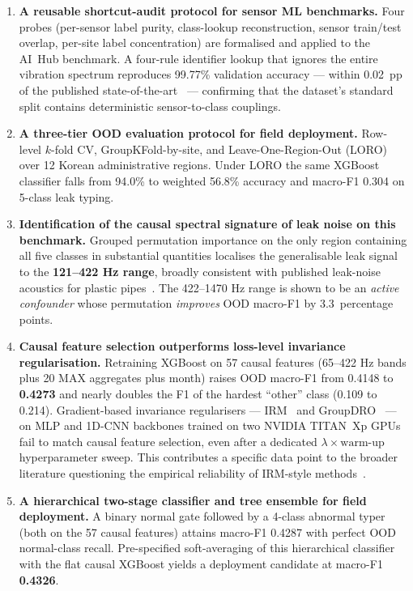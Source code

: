 \documentclass[sensors,article,submit,pdftex,oneauthor]{Definitions/mdpi}
\begin{document}
\begin{enumerate}
\item \textbf{A reusable shortcut-audit protocol for sensor ML
benchmarks.} Four probes (per-sensor label purity, class-lookup
reconstruction, sensor train/test overlap, per-site label
concentration) are formalised and applied to the AI~Hub
benchmark. A four-rule identifier lookup that ignores the entire
vibration spectrum reproduces 99.77\% validation accuracy ---
within 0.02~pp of the published state-of-the-art~\cite{lee2023leak}
--- confirming that the dataset's standard split contains
deterministic sensor-to-class couplings.

\item \textbf{A three-tier OOD evaluation protocol for field
deployment.} Row-level $k$-fold CV, GroupKFold-by-site, and
Leave-One-Region-Out (LORO) over 12 Korean administrative
regions. Under LORO the same XGBoost classifier falls from
94.0\% to weighted 56.8\% accuracy and macro-F1 0.304 on
5-class leak typing.

\item \textbf{Identification of the causal spectral signature of
leak noise on this benchmark.} Grouped permutation importance
on the only region containing all five classes in substantial
quantities localises the generalisable leak signal to the
\textbf{121--422 Hz range}, broadly consistent with published
leak-noise acoustics for plastic
pipes~\cite{hunaidi2000plastic,ismail2019review,shukla2020leakage}.
The 422--1470 Hz range is shown to be an \emph{active
confounder} whose permutation \emph{improves} OOD macro-F1 by
3.3~percentage points.

\item \textbf{Causal feature selection outperforms loss-level
invariance regularisation.} Retraining XGBoost on 57 causal
features (65--422 Hz bands plus 20 MAX aggregates plus month)
raises OOD macro-F1 from 0.4148 to \textbf{0.4273} and nearly
doubles the F1 of the hardest ``other'' class (0.109 to 0.214).
Gradient-based invariance regularisers --- IRM~\cite{arjovsky2019irm}
and GroupDRO~\cite{sagawa2020groupdro} --- on MLP and 1D-CNN
backbones trained on two NVIDIA TITAN~Xp GPUs fail to match
causal feature selection, even after a dedicated
$\lambda \times \text{warm-up}$ hyperparameter sweep. This
contributes a specific data point to the broader literature
questioning the empirical reliability of
IRM-style methods~\cite{gulrajani2021dg,rosenfeld2021irm}.

\item \textbf{A hierarchical two-stage classifier and tree
ensemble for field deployment.} A binary normal gate followed
by a 4-class abnormal typer (both on the 57 causal features)
attains macro-F1 0.4287 with perfect OOD normal-class recall.
Pre-specified soft-averaging of this hierarchical classifier
with the flat causal XGBoost yields a deployment candidate at
macro-F1 \textbf{0.4326}.
\end{enumerate}
\end{document}

